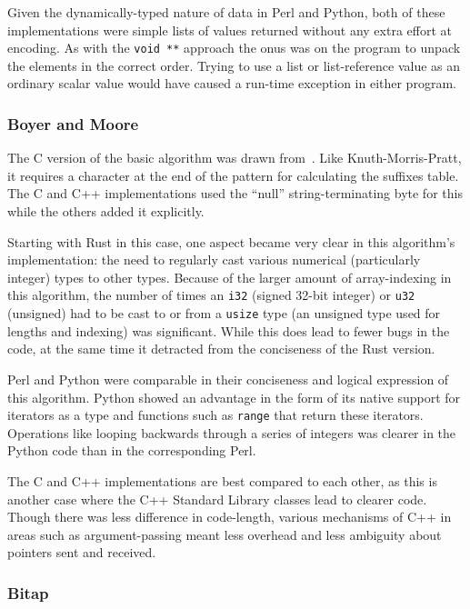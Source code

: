 Given the dynamically-typed nature of data in Perl and Python, both of these implementations were simple lists of values returned without any extra effort at encoding. As with the \texttt{void **} approach the onus was on the program to unpack the elements in the correct order. Trying to use a list or list-reference value as an ordinary scalar value would have caused a run-time exception in either program.

\subsubsection{Boyer and Moore}

The C version of the basic algorithm was drawn from~\cite[Chapter 14]{handbook}. Like Knuth-Morris-Pratt, it requires a character at the end of the pattern for calculating the suffixes table. The C and C++ implementations used the ``null'' string-terminating byte for this while the others added it explicitly.

Starting with Rust in this case, one aspect became very clear in this algorithm's implementation: the need to regularly cast various numerical (particularly integer) types to other types. Because of the larger amount of array-indexing in this algorithm, the number of times an \texttt{i32} (signed 32-bit integer) or \texttt{u32} (unsigned) had to be cast to or from a \texttt{usize} type (an unsigned type used for lengths and indexing) was significant. While this does lead to fewer bugs in the code, at the same time it detracted from the conciseness of the Rust version.

Perl and Python were comparable in their conciseness and logical expression of this algorithm. Python showed an advantage in the form of its native support for iterators as a type and functions such as \texttt{range} that return these iterators. Operations like looping backwards through a series of integers was clearer in the Python code than in the corresponding Perl.

The C and C++ implementations are best compared to each other, as this is another case where the C++ Standard Library classes lead to clearer code. Though there was less difference in code-length, various mechanisms of C++ in areas such as argument-passing meant less overhead and less ambiguity about pointers sent and received.

\subsubsection{Bitap}


